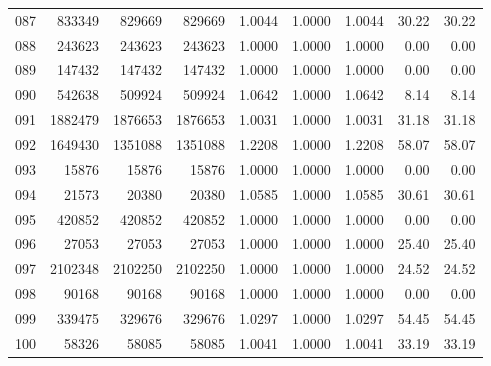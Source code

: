 \begin{longtable}{crrrrrrrr}
087 & 833349 & 829669 & 829669 & 1.0044 & 1.0000 & 1.0044 & 30.22 & 30.22 \\
088 & 243623 & 243623 & 243623 & 1.0000 & 1.0000 & 1.0000 & 0.00 & 0.00 \\
089 & 147432 & 147432 & 147432 & 1.0000 & 1.0000 & 1.0000 & 0.00 & 0.00 \\
090 & 542638 & 509924 & 509924 & 1.0642 & 1.0000 & 1.0642 & 8.14 & 8.14 \\
091 & 1882479 & 1876653 & 1876653 & 1.0031 & 1.0000 & 1.0031 & 31.18 & 31.18 \\
092 & 1649430 & 1351088 & 1351088 & 1.2208 & 1.0000 & 1.2208 & 58.07 & 58.07 \\
093 & 15876 & 15876 & 15876 & 1.0000 & 1.0000 & 1.0000 & 0.00 & 0.00 \\
094 & 21573 & 20380 & 20380 & 1.0585 & 1.0000 & 1.0585 & 30.61 & 30.61 \\
095 & 420852 & 420852 & 420852 & 1.0000 & 1.0000 & 1.0000 & 0.00 & 0.00 \\
096 & 27053 & 27053 & 27053 & 1.0000 & 1.0000 & 1.0000 & 25.40 & 25.40 \\
097 & 2102348 & 2102250 & 2102250 & 1.0000 & 1.0000 & 1.0000 & 24.52 & 24.52 \\
098 & 90168 & 90168 & 90168 & 1.0000 & 1.0000 & 1.0000 & 0.00 & 0.00 \\
099 & 339475 & 329676 & 329676 & 1.0297 & 1.0000 & 1.0297 & 54.45 & 54.45 \\
100 & 58326 & 58085 & 58085 & 1.0041 & 1.0000 & 1.0041 & 33.19 & 33.19 \\
\end{longtable}
